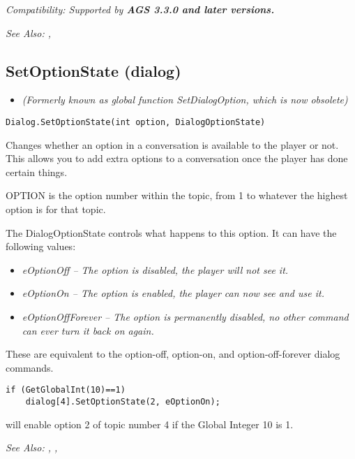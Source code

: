 \it{Compatibility:} Supported by \bf{AGS 3.3.0} and later versions.

\it{See Also:} ,

\subsection{SetOptionState (dialog)}\label{Dialog.SetOptionState}%

\begin{itemize}
\item \it{(Formerly known as global function SetDialogOption, which is now obsolete)}
\end{itemize}

\begin{verbatim}
Dialog.SetOptionState(int option, DialogOptionState)
\end{verbatim}
Changes whether an option in a conversation is available to the player or
not. This allows you to add extra options to a conversation once the player
has done certain things.

OPTION is the option number within the topic, from 1 to whatever the
highest option is for that topic.

The DialogOptionState controls what happens to this option. It can have the following
values:
\begin{itemize}
\item \it{eOptionOff} -- The option is disabled, the player will not see it.
\item \it{eOptionOn} -- The option is enabled, the player can now see and use it.
\item \it{eOptionOffForever} -- The option is permanently disabled, no other command can ever turn
  it back on again.
\end{itemize}
These are equivalent to the option-off, option-on, and option-off-forever
dialog commands.

\begin{verbatim}
if (GetGlobalInt(10)==1)
    dialog[4].SetOptionState(2, eOptionOn);
\end{verbatim}
will enable option 2 of topic number 4 if the Global Integer 10 is 1.

\it{See Also:} ,
, 


